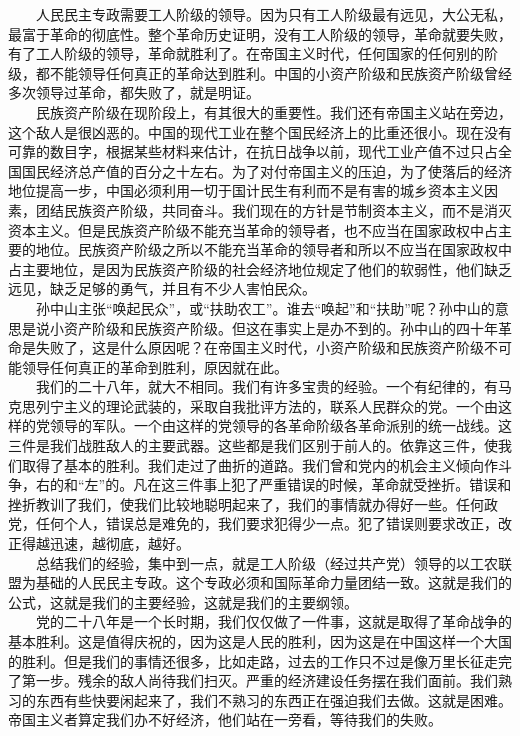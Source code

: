 \documentclass[cn,11pt,chinese]{elegantbook}
\begin{document}
　　人民民主专政需要工人阶级的领导。因为只有工人阶级最有远见，大公无私，最富于革命的彻底性。整个革命历史证明，没有工人阶级的领导，革命就要失败，有了工人阶级的领导，革命就胜利了。在帝国主义时代，任何国家的任何别的阶级，都不能领导任何真正的革命达到胜利。中国的小资产阶级和民族资产阶级曾经多次领导过革命，都失败了，就是明证。\\
　　民族资产阶级在现阶段上，有其很大的重要性。我们还有帝国主义站在旁边，这个敌人是很凶恶的。中国的现代工业在整个国民经济上的比重还很小。现在没有可靠的数目字，根据某些材料来估计，在抗日战争以前，现代工业产值不过只占全国国民经济总产值的百分之十左右。为了对付帝国主义的压迫，为了使落后的经济地位提高一步，中国必须利用一切于国计民生有利而不是有害的城乡资本主义因素，团结民族资产阶级，共同奋斗。我们现在的方针是节制资本主义，而不是消灭资本主义。但是民族资产阶级不能充当革命的领导者，也不应当在国家政权中占主要的地位。民族资产阶级之所以不能充当革命的领导者和所以不应当在国家政权中占主要地位，是因为民族资产阶级的社会经济地位规定了他们的软弱性，他们缺乏远见，缺乏足够的勇气，并且有不少人害怕民众。\\
　　孙中山主张“唤起民众”，或“扶助农工”。谁去“唤起”和“扶助”呢？孙中山的意思是说小资产阶级和民族资产阶级。但这在事实上是办不到的。孙中山的四十年革命是失败了，这是什么原因呢？在帝国主义时代，小资产阶级和民族资产阶级不可能领导任何真正的革命到胜利，原因就在此。\\
　　我们的二十八年，就大不相同。我们有许多宝贵的经验。一个有纪律的，有马克思列宁主义的理论武装的，采取自我批评方法的，联系人民群众的党。一个由这样的党领导的军队。一个由这样的党领导的各革命阶级各革命派别的统一战线。这三件是我们战胜敌人的主要武器。这些都是我们区别于前人的。依靠这三件，使我们取得了基本的胜利。我们走过了曲折的道路。我们曾和党内的机会主义倾向作斗争，右的和“左”的。凡在这三件事上犯了严重错误的时候，革命就受挫折。错误和挫折教训了我们，使我们比较地聪明起来了，我们的事情就办得好一些。任何政党，任何个人，错误总是难免的，我们要求犯得少一点。犯了错误则要求改正，改正得越迅速，越彻底，越好。\\
　　总结我们的经验，集中到一点，就是工人阶级（经过共产党）领导的以工农联盟为基础的人民民主专政。这个专政必须和国际革命力量团结一致。这就是我们的公式，这就是我们的主要经验，这就是我们的主要纲领。\\
　　党的二十八年是一个长时期，我们仅仅做了一件事，这就是取得了革命战争的基本胜利。这是值得庆祝的，因为这是人民的胜利，因为这是在中国这样一个大国的胜利。但是我们的事情还很多，比如走路，过去的工作只不过是像万里长征走完了第一步。残余的敌人尚待我们扫灭。严重的经济建设任务摆在我们面前。我们熟习的东西有些快要闲起来了，我们不熟习的东西正在强迫我们去做。这就是困难。帝国主义者算定我们办不好经济，他们站在一旁看，等待我们的失败。\\
\end{document}
